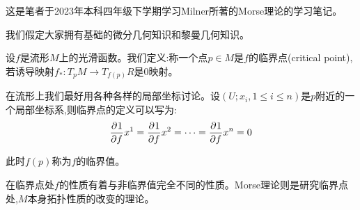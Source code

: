 \documentclass{package/fancy-book}
\begin{document}

\tableofcontents

\quad
\newpage
这是笔者于2023年本科四年级下学期学习Milner所著的Morse理论的学习笔记。

我们假定大家拥有基础的微分几何知识和黎曼几何知识。

设$f$是流形$M$上的光滑函数。我们定义:称一个点$p\in M$是$f$的临界点(critical point),若诱导映射$f_*:T_pM \to T_{f(p)}R$是$0$映射。

在流形上我们最好用各种各样的局部坐标讨论。设$(U;x_i,1\leq i \leq n)$是$p$附近的一个局部坐标系,则临界点的定义可以写为:
\begin{align}
	\frac{\partial^{} 1}{\partial {f}^{}}{x^1}=\frac{\partial^{} 1}{\partial {f}^{}}{x^2}=\dots=\frac{\partial^{} 1}{\partial {f}^{}}{x^n}=0
\end{align}

此时$f(p)$称为$f$的临界值。

在临界点处$f$的性质有着与非临界值完全不同的性质。Morse理论则是研究临界点处,$M$本身拓扑性质的改变的理论。

\end{document}
